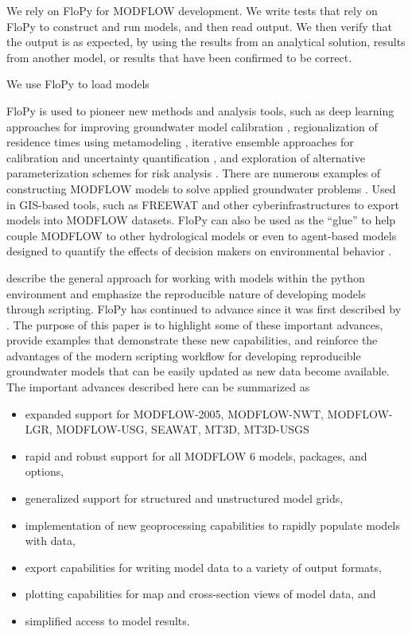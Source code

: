 \documentclass[11pt, oneside]{article}   	%
\begin{document}
We rely on FloPy for MODFLOW development.  We write tests that rely on FloPy to construct and run models, and then read output.  We then verify that the output is as expected, by using the results from an analytical solution, results from another model, or results that have been confirmed to be correct.

We use FloPy to load models

 FloPy is used to pioneer new methods and analysis tools, such as deep learning approaches for improving groundwater model calibration \citep{sun2018, zhou2021}, regionalization of residence times using metamodeling \citep{starn2018}, iterative ensemble approaches for calibration and uncertainty quantification \citep{white2018ies}, and exploration of alternative parameterization schemes for risk analysis \citep{knowling2019}. There are numerous examples of constructing MODFLOW models to solve applied groundwater problems \citep{befus2017, vanengelen2018, ebeling2019, zipper2019, befus2020}.  Used in GIS-based tools, such as FREEWAT \citep{freewat2018} and other cyberinfrastructures \citep{essawy2018} to export models into MODFLOW datasets.  FloPy can also be used as the ``glue'' to help couple MODFLOW to other hydrological models \citep{burek2020} or even to agent-based models designed to quantify the effects of decision makers on environmental behavior \citep{jaxarozen2019}. 

\cite{bakker2016scripting} describe the general approach for working with models within the python environment and emphasize the reproducible nature of developing models through scripting.  FloPy has continued to advance since it was first described by \cite{bakker2016scripting}.  The purpose of this paper is to highlight some of these important advances, provide examples that demonstrate these new capabilities, and reinforce the advantages of the modern scripting workflow for developing reproducible groundwater models that can be easily updated as new data become available.  The important advances described here can be summarized as

\begin{itemize}
\item expanded support for MODFLOW-2005, MODFLOW-NWT, MODFLOW-LGR, MODFLOW-USG, SEAWAT, MT3D, MT3D-USGS
\item rapid and robust support for all MODFLOW 6 models, packages, and options,
\item generalized support for structured and unstructured model grids,
\item implementation of new geoprocessing capabilities to rapidly populate models with data, 
\item export capabilities for writing model data to a variety of output formats, 
\item plotting capabilities for map and cross-section views of model data, and
\item simplified access to model results.
\end{itemize}
\end{document}
